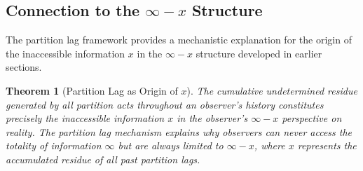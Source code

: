 \documentclass[12pt,a4paper]{article}
\newtheorem{theorem}{Theorem}[section]
\theoremstyle{definition}
\theoremstyle{remark}
\begin{document}
\subsection{Connection to the $\infty - x$ Structure}

The partition lag framework provides a mechanistic explanation for the origin of the inaccessible information $x$ in the $\infty - x$ structure developed in earlier sections.

\begin{theorem}[Partition Lag as Origin of $x$]
\label{thm:partition_lag_x}
The cumulative undetermined residue generated by all partition acts throughout an observer's history constitutes precisely the inaccessible information $x$ in the observer's $\infty - x$ perspective on reality. The partition lag mechanism explains why observers can never access the totality of information $\infty$ but are always limited to $\infty - x$, where $x$ represents the accumulated residue of all past partition lags.
\end{theorem}
\end{document}
